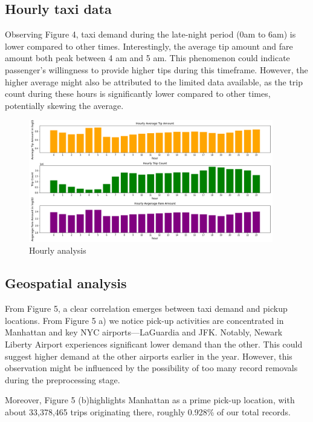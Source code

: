 \documentclass[11pt]{article}
\begin{document}
\subsection{Hourly taxi data}
Observing Figure 4, taxi demand during the late-night period (0am to 6am) is lower compared to other times. Interestingly, the average tip amount and fare amount both peak between 4 am and 5 am. This phenomenon could indicate passenger's willingness to provide higher tips during this timeframe. However, the higher average might also be attributed to the limited data available, as the trip count during these hours is significantly lower compared to other times, potentially skewing the average.
\begin{figure}[h]
    \includegraphics[width=0.95\textwidth]{plots/hourly_analysis.png}
    \centering
    \caption{Hourly analysis} %
\end{figure}

\subsection{Geospatial analysis}
From Figure 5, a clear correlation emerges between taxi demand and pickup locations. From Figure 5 a) we notice pick-up activities are concentrated in Manhattan and key NYC airports—LaGuardia and JFK. Notably, Newark Liberty Airport experiences significant lower demand than the other. This could suggest higher demand at the other airports earlier in the year. However, this observation might be influenced by the possibility of too many record removals during the preprocessing stage.

Moreover, Figure 5 (b)highlights Manhattan as a prime pick-up location, with about 33,378,465 trips originating there, roughly 0.928\% of our total records.
\end{document}
